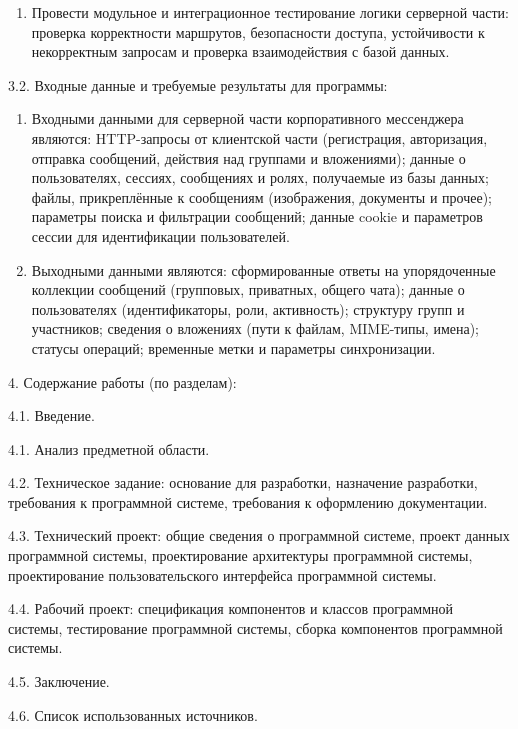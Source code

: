 {\begin{enumerate}
	\item Провести модульное и интеграционное тестирование логики серверной части: проверка корректности маршрутов, безопасности доступа, устойчивости к некорректным запросам и проверка взаимодействия с базой данных.
\end{enumerate}



{\parindent0pt
  3.2. Входные данные и требуемые результаты для программы:}

\begin{enumerate}
	\item Входными данными для серверной части корпоративного мессенджера являются: HTTP-запросы от клиентской части (регистрация, авторизация, отправка сообщений, действия над группами и вложениями); данные о пользователях, сессиях, сообщениях и ролях, получаемые из базы данных; файлы, прикреплённые к сообщениям (изображения, документы и прочее); параметры поиска и фильтрации сообщений; данные cookie и параметров сессии для идентификации пользователей.
	
	\item Выходными данными являются: сформированные ответы на упорядоченные коллекции сообщений (групповых, приватных, общего чата); данные о пользователях (идентификаторы, роли, активность); структуру групп и участников; сведения о вложениях (пути к файлам, MIME-типы, имена); статусы операций; временные метки и параметры синхронизации.
\end{enumerate}


{\parindent0pt

  4. Содержание работы (по разделам):
  
  4.1. Введение.
  
  4.1. Анализ предметной области.
  
4.2. Техническое задание: основание для разработки, назначение разработки,
требования к программной системе, требования к оформлению документации.

4.3. Технический проект: общие сведения о программной системе, проект
данных программной системы, проектирование архитектуры программной системы, проектирование пользовательского интерфейса программной системы.

4.4. Рабочий проект: спецификация компонентов и классов программной системы, тестирование программной системы, сборка компонентов программной системы.

4.5. Заключение.

4.6. Список использованных источников.

}}

